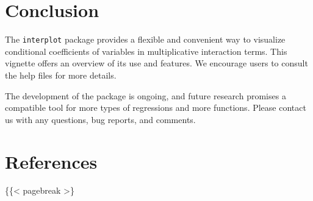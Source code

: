 \documentclass[
  article]{jss}
\newlength{\cslhangindent}
\newlength{\cslentryspacingunit} %
\newenvironment{CSLReferences}[2] %
 {%
  \setlength{\parindent}{0pt}
  \ifodd #1
  \let\oldpar\par
  \def\par{\hangindent=\cslhangindent\oldpar}
  \fi
  \setlength{\parskip}{#2\cslentryspacingunit}
 }%
 {}
\begin{document}
\hypertarget{sec-conclusion}{%
\section{Conclusion}\label{sec-conclusion}}

The \texttt{interplot} package provides a flexible and convenient way to
visualize conditional coefficients of variables in multiplicative
interaction terms. This vignette offers an overview of its use and
features. We encourage users to consult the help files for more details.

The development of the package is ongoing, and future research promises
a compatible tool for more types of regressions and more functions.
Please contact us with any questions, bug reports, and comments.

\hypertarget{sec-references}{%
\section*{References}\label{sec-references}}

\hypertarget{refs}{}
\begin{CSLReferences}{0}{0}
\end{CSLReferences}

\{\{\textless{} pagebreak \textgreater\}


  
\end{document}
